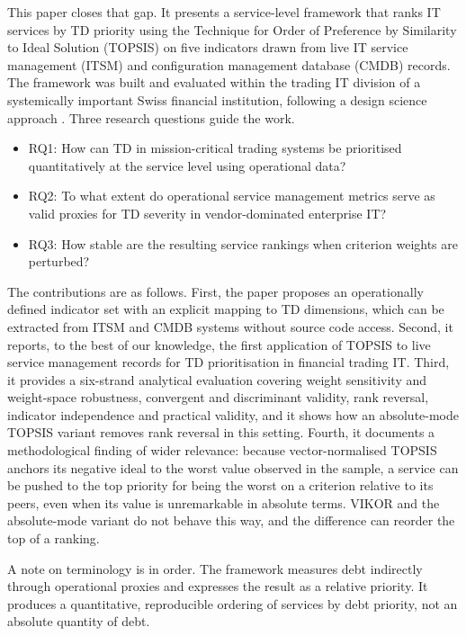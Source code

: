 \documentclass[
  authoryear,
  preprint]{elsarticle}
\providecommand{\tightlist}{%
  \setlength{\itemsep}{0pt}\setlength{\parskip}{0pt}}
\begin{document}
This paper closes that gap. It presents a service-level framework that
ranks IT services by TD priority using the Technique for Order of
Preference by Similarity to Ideal Solution (TOPSIS)
\citep{hwangMultipleAttributeDecision1981} on five indicators drawn from
live IT service management (ITSM) and configuration management database
(CMDB) records. The framework was built and evaluated within the trading
IT division of a systemically important Swiss financial institution,
following a design science approach
\citep{hevnerDesignScienceInformation2004}. Three research questions
guide the work.

\begin{itemize}
\tightlist
\item
  RQ1: How can TD in mission-critical trading systems be prioritised
  quantitatively at the service level using operational data?
\item
  RQ2: To what extent do operational service management metrics serve as
  valid proxies for TD severity in vendor-dominated enterprise IT?
\item
  RQ3: How stable are the resulting service rankings when criterion
  weights are perturbed?
\end{itemize}

The contributions are as follows. First, the paper proposes an
operationally defined indicator set with an explicit mapping to TD
dimensions, which can be extracted from ITSM and CMDB systems without
source code access. Second, it reports, to the best of our knowledge,
the first application of TOPSIS to live service management records for
TD prioritisation in financial trading IT. Third, it provides a
six-strand analytical evaluation covering weight sensitivity and
weight-space robustness, convergent and discriminant validity, rank
reversal, indicator independence and practical validity, and it shows
how an absolute-mode TOPSIS variant removes rank reversal in this
setting. Fourth, it documents a methodological finding of wider
relevance: because vector-normalised TOPSIS anchors its negative ideal
to the worst value observed in the sample, a service can be pushed to
the top priority for being the worst on a criterion relative to its
peers, even when its value is unremarkable in absolute terms. VIKOR and
the absolute-mode variant do not behave this way, and the difference can
reorder the top of a ranking.

A note on terminology is in order. The framework measures debt
indirectly through operational proxies and expresses the result as a
relative priority. It produces a quantitative, reproducible ordering of
services by debt priority, not an absolute quantity of debt.
\end{document}

